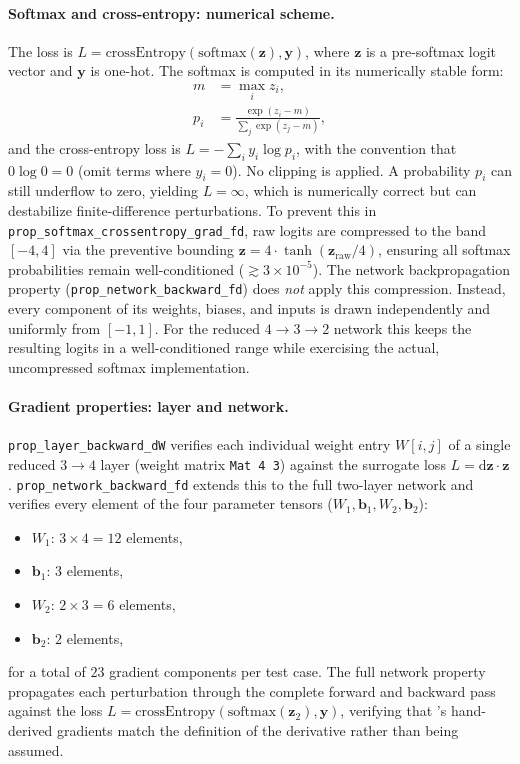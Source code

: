 \documentclass[sigconf,nonacm]{acmart}
\begin{document}
\paragraph{Softmax and cross-entropy: numerical scheme.}
The loss is $L = \mathrm{crossEntropy}(\mathrm{softmax}(\mathbf{z}), \mathbf{y})$, where
$\mathbf{z}$ is a pre-softmax logit vector and $\mathbf{y}$ is one-hot. The softmax
is computed in its numerically stable form:
\begin{align}
  m &= \max_i z_i, \\
  p_i &= \frac{\exp(z_i - m)}{\sum_j \exp(z_j - m)},
\end{align}
and the cross-entropy loss is $L = -\sum_i y_i \log p_i$, with the convention that
$0 \log 0 = 0$ (omit terms where $y_i = 0$). No clipping is applied. A probability
$p_i$ can still underflow to zero, yielding $L = \infty$, which is numerically
correct but can destabilize finite-difference perturbations. To prevent this in
\texttt{prop\_softmax\_crossentropy\_grad\_fd}, raw logits are compressed to the band
$[-4, 4]$ via the preventive bounding $\mathbf{z} = 4 \cdot \tanh(\mathbf{z}_{\mathrm{raw}} / 4)$,
ensuring all softmax probabilities remain well-conditioned ($\gtrsim 3 \times 10^{-5}$).
The network backpropagation property (\texttt{prop\_network\_backward\_fd}) does
\emph{not} apply this compression. Instead, every component of its weights,
biases, and inputs is drawn independently and uniformly from $[-1,1]$. For the
reduced $4\to3\to2$ network this keeps the resulting logits in a well-conditioned
range while exercising the actual, uncompressed softmax implementation.

\paragraph{Gradient properties: layer and network.}
\texttt{prop\_layer\_backward\_dW} verifies each individual weight entry $W[i,j]$ of
a single reduced $3 \to 4$ layer (weight matrix \texttt{Mat 4 3}) against the
surrogate loss $L = \mathrm{d}\mathbf{z} \cdot \mathbf{z}$.
\texttt{prop\_network\_backward\_fd} extends this to the full two-layer network and
verifies every element of the four parameter tensors ($W_1, \mathbf{b}_1, W_2, \mathbf{b}_2$):
\begin{itemize}
  \item $W_1$: $3 \times 4 = 12$ elements,
  \item $\mathbf{b}_1$: $3$ elements,
  \item $W_2$: $2 \times 3 = 6$ elements,
  \item $\mathbf{b}_2$: $2$ elements,
\end{itemize}
for a total of $23$ gradient components per test case. The full network property
propagates each perturbation through the complete forward and backward pass against
the loss $L = \mathrm{crossEntropy}(\mathrm{softmax}(\mathbf{z}_2), \mathbf{y})$,
verifying that 's hand-derived gradients match the definition of
the derivative rather than being assumed.
\end{document}
